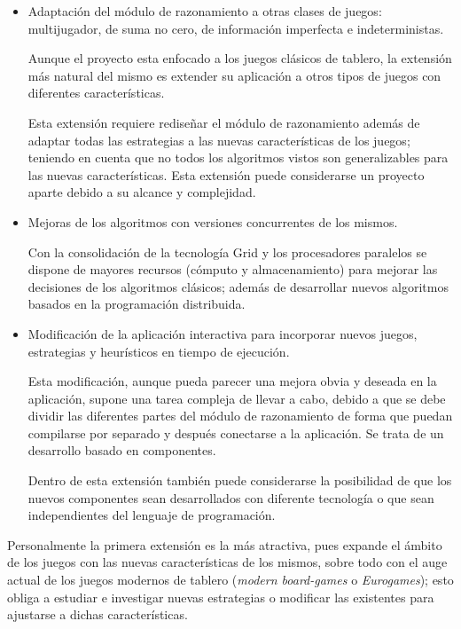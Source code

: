 \begin{itemize}
	\item Adaptación del módulo de razonamiento a otras clases de juegos: multijugador, de suma no cero, de información imperfecta e indeterministas.

	Aunque el proyecto esta enfocado a los juegos clásicos de tablero, la extensión más natural del mismo es extender su aplicación a otros tipos de juegos con diferentes características.
	
	Esta extensión requiere rediseñar el módulo de razonamiento además de adaptar todas las estrategias a las nuevas características de los juegos; teniendo en cuenta que no todos los algoritmos vistos son generalizables para las nuevas características. 
	Esta extensión puede considerarse un proyecto aparte debido a su alcance y complejidad.		
	
	\item Mejoras de los algoritmos con versiones concurrentes de los mismos.

	Con la consolidación de la tecnología Grid y los procesadores paralelos se dispone de mayores recursos (cómputo y almacenamiento) para mejorar las decisiones de los algoritmos clásicos; además de desarrollar nuevos algoritmos basados en la programación distribuida.
	
	\item Modificación de la aplicación interactiva para incorporar nuevos juegos, estrategias y heurísticos en tiempo de ejecución.
	
	Esta modificación, aunque pueda parecer una mejora obvia y deseada en la aplicación, supone una tarea compleja de llevar a cabo, debido a que se debe dividir las diferentes partes del módulo de razonamiento de forma que puedan compilarse por separado y después conectarse a la aplicación.
	Se trata de un desarrollo basado en componentes.	

	Dentro de esta extensión también puede considerarse la posibilidad de que los nuevos componentes sean desarrollados con diferente tecnología o que sean independientes del lenguaje de programación.
		
\end{itemize}

Personalmente la primera extensión es la más atractiva, pues expande el ámbito de los juegos con las nuevas características de los mismos, sobre todo con el auge actual de los juegos modernos de tablero (\textit{modern board-games} o \textit{Eurogames}); esto obliga a estudiar e investigar nuevas estrategias o modificar las existentes para ajustarse a dichas características.

